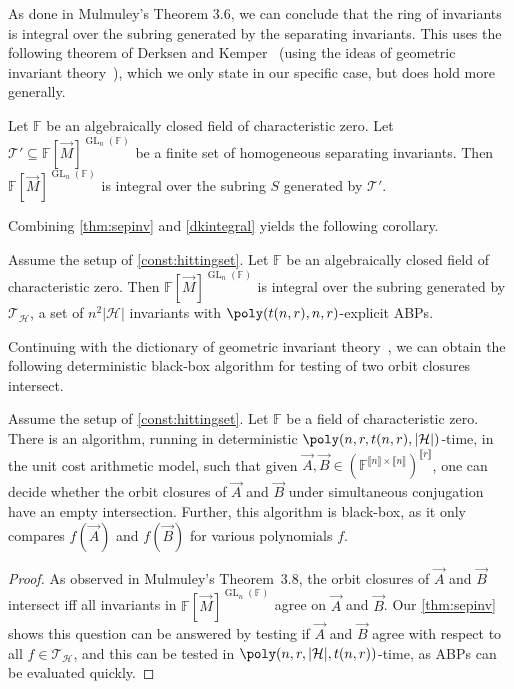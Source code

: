 \documentclass[letterpaper,11pt]{article}
\numberwithin{equation}{section}
\theoremstyle{plain}
\theoremstyle{remark}
\newcommand{\zr}[1]{{\llbracket {#1}\rrbracket}}
\DeclareMathOperator{\GL}{GL}
\newcommand{\F}{\mathbb{F}}
\newcommand{\cH}{\mathcal{H}}
\newcommand{\cT}{\mathcal{T}}
\begin{document}
As done in Mulmuley's Theorem 3.6, we can conclude that the ring of invariants is integral over the subring generated by the separating invariants.  This uses the following theorem of Derksen and Kemper~\cite{DK} (using the ideas of geometric invariant theory~\cite{MFK}), which we only state in our specific case, but does hold more generally.

\begin{theorem}
	\label{dkintegral}
	Let $\F$ be an algebraically closed field of characteristic zero. Let $\cT'\subseteq \F[\vec{M}]^{\GL_n(\F)}$ be a finite set of homogeneous separating invariants.  Then $\F[\vec{M}]^{\GL_n(\F)}$ is integral over the subring $S$ generated by $\cT'$.
\end{theorem}

Combining \autoref{thm:sepinv} and \autoref{dkintegral} yields the following corollary.

\begin{corollary}\label{thm:general integral}
	Assume the setup of \autoref{const:hittingset}. Let $\F$ be an algebraically closed field of characteristic zero. Then $\F[\vec{M}]^{\GL_n(\F)}$ is integral over the subring generated by $\cT_\cH$, a set of $n^2|\cH|$ invariants with $\poly(t(n,r),n,r)$-explicit ABPs.
\end{corollary}

Continuing with the dictionary of geometric invariant theory~\cite{MFK},  we can obtain the following deterministic black-box algorithm for testing of two orbit closures intersect.

\begin{corollary}
	\label{blackboxorbitclosure}
	Assume the setup of \autoref{const:hittingset}. Let $\F$ be a field of characteristic zero. There is an algorithm, running in deterministic $\poly(n,r,t(n,r),|\cH|)$-time, in the unit cost arithmetic model, such that given $\vec{A},\vec{B}\in(\F^{\zr{n}\times \zr{n}})^{\zr{r}}$, one can decide whether the orbit closures of $\vec{A}$ and $\vec{B}$ under simultaneous conjugation have an empty intersection. Further, this algorithm is black-box, as it only compares $f(\vec{A})$ and $f(\vec{B})$ for various polynomials $f$.
\end{corollary}
\begin{proof}
	As observed in Mulmuley's Theorem~3.8, the orbit closures of $\vec{A}$ and $\vec{B}$ intersect iff all invariants in $\F[\vec{M}]^{\GL_n(\F)}$ agree on $\vec{A}$ and $\vec{B}$. Our \autoref{thm:sepinv} shows this question can be answered by testing if $\vec{A}$ and $\vec{B}$ agree with respect to all $f\in\cT_\cH$, and this can be tested in $\poly(n,r,|\cH|,t(n,r))$-time, as ABPs can be evaluated quickly.
\end{proof}
\end{document}
